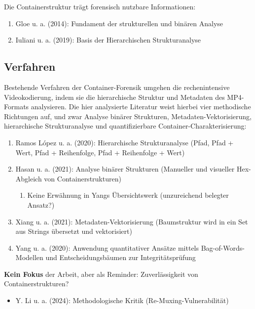 Die Containerstruktur trägt forensisch nutzbare Informationen:

\begin{enumerate}
    \item Gloe u. a. (2014)\cite{gloe_forensic_2014}: Fundament der strukturellen und binären Analyse
    \item Iuliani u. a. (2019)\cite{iuliani_video_2019}: Basis der Hierarchischen Strukturanalyse\end{enumerate}

\subsection{Verfahren}

Bestehende Verfahren der Container-Forensik umgehen die rechenintensive Videokodierung, indem sie die hierarchische Struktur und Metadaten des MP4-Formats analysieren. Die hier analysierte Literatur weist hierbei vier methodische Richtungen auf, und zwar Analyse binärer Strukturen, Metadaten-Vektorisierung, hierarchische Strukturanalyse und quantifizierbare Container-Charakterisierung:

\begin{enumerate}
    \item Ramos López u. a. (2020)\cite{ramos_lopez_digital_2020}: Hierarchische Strukturanalyse (Pfad, Pfad + Wert, Pfad + Reihenfolge, Pfad + Reihenfolge + Wert)
    \item Hasan u. a. (2021)\cite{hasan_forensic_2021}: Analyse binärer Strukturen (Manueller und visueller Hex-Abgleich von Containerstrukturen)
    \begin{enumerate}
        \item Keine Erwähnung in Yangs Übersichtswerk (unzureichend belegter Ansatz?)
    \end{enumerate}
    \item Xiang u. a. (2021)\cite{xiang_forensic_2021}: Metadaten-Vektorisierung (Baumstruktur wird in ein Set aus Strings übersetzt und vektorisiert)
    \item Yang u. a. (2020)\cite{yang_efficient_2020}: Anwendung quantitativer Ansätze mittels Bag-of-Words-Modellen und Entscheidungsbäumen zur Integritätsprüfung
\end{enumerate}


\textbf{Kein Fokus} der Arbeit, aber als Reminder: Zuverlässigkeit von Containerstrukturen?

\begin{itemize}
    \item Y. Li u. a. (2024)\cite{li_learning_2024}: Methodologische Kritik (Re-Muxing-Vulnerabilität)
\end{itemize}



